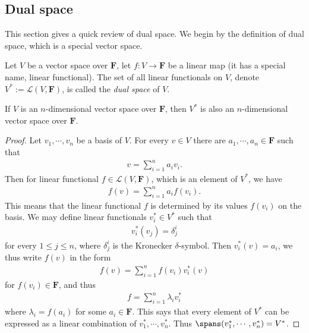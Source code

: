 \begin{subappendices}

\section{Dual space}\label{A:dual space}

This section gives a quick review of dual space. We begin by the definition of dual space, which is a special vector space.
\begin{definition}
    Let $V$ be a vector space over $\mathbf{F}$, let $f : V \to \mathbf{F}$ be a linear map (it has a special name, linear functional). The set of all linear functionals on $V$, denote $V^* := \mathcal{L}(V, \mathbf{F})$, is called the \emph{dual space} of $V$.
\end{definition}

\begin{lemma}\label{lem:dimension of dual space}
    If $V$ is an $n$-dimensional vector space over $\mathbf{F}$, then $V^*$ is also an $n$-dimensional vector space over $\mathbf{F}$.
\end{lemma}

\begin{proof}
    Let $v_1, \cdots, v_n$ be a basis of $V$. For every $v \in V$ there are $a_1, \cdots, a_n \in \mathbf{F}$ such that
    \begin{align*}
        v = \sum_{i = 1}^{n}a_iv_i.
    \end{align*}
    Then for linear functional $f \in \mathcal{L}(V, \mathbf{F})$, which is an element of $V^*$, we have
    \begin{align*}
        f(v) = \sum_{i = 1}^{n}a_if(v_i).
    \end{align*}
    This means that the linear functional $f$ is determined by its values $f(v_i)$ on the basis. We may define linear functionals $v_i^* \in V^*$ such that
    \begin{align*}
        v_i^*(v_j) = \delta_{j}^{i}
    \end{align*}
    for every $1 \leq j \leq n$, where $\delta_j^i$ is the Kronecker $\delta$-symbol. Then $v_i^*(v) = a_i$, we thus write $f(v)$ in the form
    \begin{align*}
        f(v) = \sum_{i = 1}^{n}f(v_i)v_i^*(v)
    \end{align*}
    for $f(v_i) \in \mathbf{F}$, and thus
    \begin{align*}
        f = \sum_{i = 1}^{n}\lambda_iv_i^*
    \end{align*}
    where $\lambda_i = f(a_i)$ for some $a_i \in \mathbf{F}$. This says that every element of $V^*$ can be expressed as a linear combination of $v_1^*, \cdots, v_n^*$. Thus $\spans(v_1^*, \cdots, v_n^*) = V^*$.


\end{proof}
\end{subappendices}
